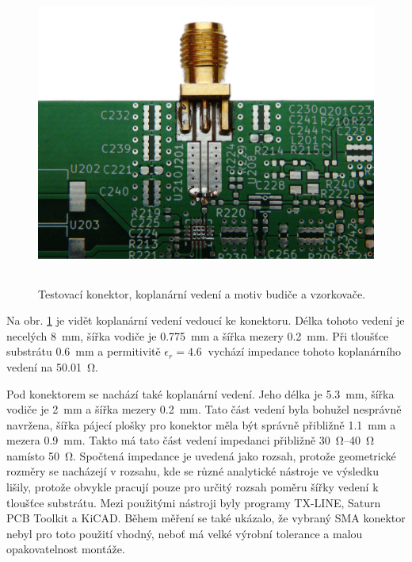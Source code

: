\begin{figure}[htbp]
\includegraphics[width=\textwidth,height=10cm,keepaspectratio]{images/pcb/pcb_coplanar.jpg}\caption{Testovací konektor, koplanární vedení a motiv budiče a vzorkovače.}\label{pcb_coplanar}
\end{figure}

Na obr. \ref{pcb_coplanar} je vidět koplanární vedení vedoucí ke konektoru. Délka tohoto vedení je necelých \SI{8}{\milli\meter}, šířka vodiče je \SI{0.775}{\milli\meter} a šířka mezery \SI{0.2}{\milli\meter}. Při tloušťce substrátu \SI{0.6}{\milli\meter} a permitivitě $\epsilon _r= \SI{4.6}{}$ vychází impedance tohoto koplanárního vedení na \SI{50.01}{\ohm}.

Pod konektorem se nachází také koplanární vedení. Jeho délka je \SI{5.3}{\milli\meter}, šířka vodiče je \SI{2}{\milli\meter} a šířka mezery \SI{0.2}{\milli\meter}. Tato část vedení byla bohužel nesprávně navržena, šířka pájecí plošky pro konektor měla být správně přibližně \SI{1.1}{\milli\meter} a mezera \SI{0.9}{\milli\meter}. Takto má tato část vedení impedanci přibližně \SIrange{30}{40}{\ohm} namísto \SI{50}{\ohm}. Spočtená impedance je uvedená jako rozsah, protože geometrické rozměry se nacházejí v rozsahu, kde se různé analytické nástroje ve výsledku lišily, protože obvykle pracují pouze pro určitý rozsah poměru šířky vedení k tloušťce substrátu. Mezi použitými nástroji byly programy TX-LINE, Saturn PCB Toolkit a KiCAD. Během měření se také ukázalo, že vybraný SMA konektor nebyl pro toto použití vhodný, neboť má velké výrobní tolerance a malou opakovatelnost montáže.

